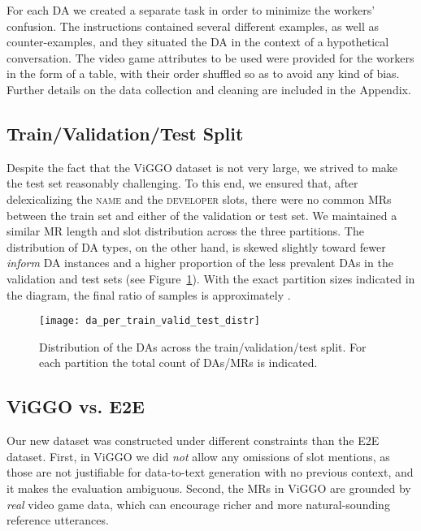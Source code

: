 \documentclass[11pt,a4paper]{article}
\begin{document}
For each DA we created a separate task in order to minimize the workers' confusion. The instructions contained several different examples, as well as counter-examples, and they situated the DA in the context of a hypothetical conversation. The video game attributes to be used were provided for the workers in the form of a table, with their order shuffled so as to avoid any kind of bias. Further details on the data collection and cleaning are included in the Appendix.



\subsection{Train/Validation/Test Split}

Despite the fact that the ViGGO dataset is not very large, we strived to make the test set reasonably challenging. To this end, we ensured that, after delexicalizing the \textsc{name} and the \textsc{developer} slots, there were no common MRs between the train set and either of the validation or test set. We maintained a similar MR length and slot distribution across the three partitions. The distribution of DA types, on the other hand, is skewed slightly toward fewer \emph{inform} DA instances and a higher proportion of the less prevalent DAs in the validation and test sets (see Figure~\ref{fig:da_per_train_valid_test_distr}). With the exact partition sizes indicated in the diagram, the final ratio of samples is approximately .

\begin{figure}
    \begin{center}
        \texttt{[image: da\_per\_train\_valid\_test\_distr]}
    \end{center}
    \vspace{-0.2cm}
    \caption{Distribution of the DAs across the train/validation/test split. For each partition the total count of DAs/MRs is indicated.}
    \label{fig:da_per_train_valid_test_distr}
\end{figure}


\subsection{ViGGO vs. E2E}
\label{sec:vg_vs_e2e}

Our new dataset was constructed under different constraints than the E2E dataset. First, in ViGGO we did \emph{not} allow any omissions of slot mentions, as those are not justifiable for data-to-text generation with no previous context, and it makes the evaluation ambiguous. Second, the MRs in ViGGO are grounded by \emph{real} video game data, which can encourage richer and more natural-sounding reference utterances.
\end{document}
